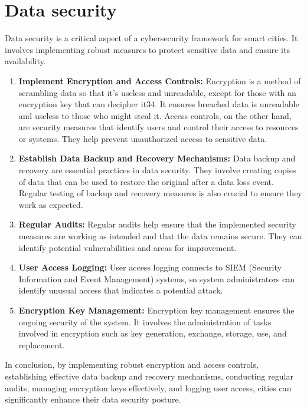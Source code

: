 \documentclass{article}
\begin{document}
\section{Data security}
Data security is a critical aspect of a cybersecurity framework for smart cities. It involves implementing robust measures to protect sensitive data and ensure its availability\cite{otoole-2023}\cite{joshi-2021}.
\begin{enumerate}[label=\alph*)]
    \item \textbf{Implement Encryption and Access Controls:} Encryption is a method of scrambling data so that it’s useless and unreadable, except for those with an encryption key that can decipher it34\cite{amthul-2019}\cite{appleton-2022}. It ensures breached data is unreadable and useless to those who might steal it\cite{amthul-2019}. Access controls, on the other hand, are security measures that identify users and control their access to resources or systems\cite{amthul-2019}. They help prevent unauthorized access to sensitive data\cite{amthul-2019}.
    \item \textbf{Establish Data Backup and Recovery Mechanisms:} Data backup and recovery are essential practices in data security\cite{isaca-db-backup-2012}\cite{convocar-2023}\cite{flynn-2021}. They involve creating copies of data that can be used to restore the original after a data loss event\cite{isaca-db-backup-2012}\cite{convocar-2023}\cite{flynn-2021}. Regular testing of backup and recovery measures is also crucial to ensure they work as expected\cite{isaca-db-backup-2012}\cite{convocar-2023}\cite{flynn-2021}.
    \item \textbf{Regular Audits:} Regular audits help ensure that the implemented security measures are working as intended and that the data remains secure\cite{isaca-db-backup-2012}. They can identify potential vulnerabilities and areas for improvement\cite{isaca-db-backup-2012}.
    \item \textbf{User Access Logging:} User access logging connects to SIEM (Security Information and Event Management) systems, so system administrators can identify unusual access that indicates a potential attack\cite{amthul-2019}.
    \item \textbf{Encryption Key Management:} Encryption key management ensures the ongoing security of the system\cite{amthul-2019}. It involves the administration of tasks involved in encryption such as key generation, exchange, storage, use, and replacement\cite{amthul-2019}.
\end{enumerate}
In conclusion, by implementing robust encryption and access controls, establishing effective data backup and recovery mechanisms, conducting regular audits, managing encryption keys effectively, and logging user access, cities can significantly enhance their data security posture.
\end{document}
